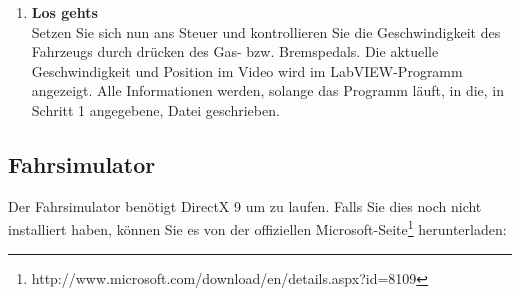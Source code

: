 \begin{enumerate}[label=\arabic*.]
\item \textbf{Los gehts}\\
Setzen Sie sich nun ans Steuer und kontrollieren Sie die Geschwindigkeit des Fahrzeugs durch drücken des Gas- bzw. Bremspedals. Die aktuelle Geschwindigkeit und Position im Video wird im LabVIEW-Programm angezeigt. Alle Informationen werden, solange das Programm läuft, in die, in Schritt 1 angegebene, Datei geschrieben.

\end{enumerate}

\newpage
\subsection{Fahrsimulator}
Der Fahrsimulator benötigt DirectX 9 um zu laufen. Falls Sie dies noch nicht installiert haben, können Sie es von der offiziellen Microsoft-Seite\footnote{http://www.microsoft.com/download/en/details.aspx?id=8109} herunterladen: 

